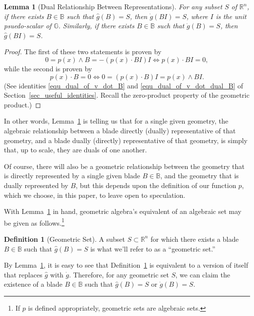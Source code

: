 \documentclass{birkjour}
\newtheorem{lem}[thm]{Lemma}
\theoremstyle{definition}
\newtheorem{defn}[thm]{Definition}
\theoremstyle{remark}
\numberwithin{equation}{section}
\newcommand{\R}{\mathbb{R}}
\newcommand{\B}{\mathbb{B}}
\newcommand{\G}{\mathbb{G}}
\newcommand{\gd}{\dot{g}}
\newcommand{\gh}{\hat{g}}
\begin{document}
\begin{lem}[Dual Relationship Between Representations]\label{lem_dual_rep}
For any subset $S$ of $\R^n$, if there exists $B\in\B$ such that $\gh(B)=S$, then $\gd(BI)=S$, where
$I$ is the unit psuedo-scalar of $\G$.  Similarly, if there exists $B\in\B$ such that $\gd(B)=S$, then $\gh(BI)=S$.
\end{lem}
\begin{proof}
The first of these two statements is proven by
\begin{equation*}
0=p(x)\wedge B=-(p(x)\cdot BI)I\iff p(x)\cdot BI=0,
\end{equation*}
while the second is proven by
\begin{equation*}
p(x)\cdot B=0\iff 0=(p(x)\cdot B)I=p(x)\wedge BI.
\end{equation*}
(See identities \eqref{equ_dual_of_v_dot_B} and \eqref{equ_dual_of_v_dot_dual_B} of Section~\ref{sec_useful_identities}.  Recall the zero-product property of the geometric product.)
\end{proof}

In other words, Lemma~\ref{lem_dual_rep} is telling us that for a single given geometry, the algebraic relationship between a
blade directly (dually) representative of that geometry, and a blade dually (directly) representative of that geometry, is simply
that, up to scale, they are duals of one another.

Of course, there will also be a geometric relationship between the geometry that is directly represented by a single given
blade $B\in\B$, and the geometry that is dually represented by $B$, but this depends upon the definition of our function
$p$, which we choose, in this paper, to leave open to speculation.

With Lemma~\ref{lem_dual_rep} in hand, geometric algebra's equivalent of an algebraic set may be given as follows.\footnote{If $p$ is
defined appropriately, geometric sets are algebraic sets.}

\begin{defn}[Geometric Set]\label{def_geo_set}
A subset $S\subset\R^n$ for which there exists a blade $B\in\B$ such that $\gh(B)=S$ is what we'll refer to as a ``geometric set.''
\end{defn}

By Lemma~\ref{lem_dual_rep}, it is easy to see that Definition~\ref{def_geo_set} is equivalent to a version of itself that replaces $\gh$ with $\gd$.
Therefore, for any geometric set $S$, we can claim the existence of a blade $B\in\B$ such that $\gh(B)=S$ or $\gd(B)=S$.
\end{document}

